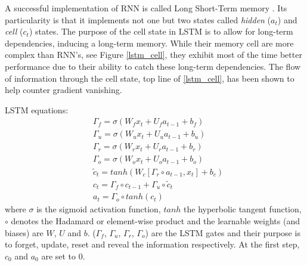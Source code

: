\documentclass[12pt, a4paper]{report}
\begin{document}
		\par
		A successful implementation of RNN is called Long Short-Term memory \cite{Hochreiter1997lstm}.
		Its particularity is that it implements not one but two states called {\itshape hidden} ($a_{t}$) and {\itshape cell} ($c_{t}$) states.
		The purpose of the cell state in LSTM is to allow for long-term dependencies, inducing a long-term memory.
		While their memory cell are more complex than RNN's, see Figure \ref{lstm_cell}, they exhibit most of the time better performance due to their ability to catch these long-term dependencies.
		The flow of information through the cell state, top line of \ref{lstm_cell}, has been shown to help counter gradient vanishing.
		\par
		LSTM equations:
		\begin{align*}
			& \Gamma_{f} = \sigma(W_{f}x_{t} + U_{f}a_{t-1} + b_{f}) \\
			& \Gamma_{u} = \sigma(W_{u}x_{t} + U_{u}a_{t-1} + b_{u}) \\
			& \Gamma_{r} = \sigma(W_{r}x_{t} + U_{r}a_{t-1} + b_{r}) \\
			& \Gamma_{o} = \sigma(W_{o}x_{t} + U_{o}a_{t-1} + b_{o}) \\
			& \tilde{c}_{t} = tanh(W_{c}[\Gamma_{r} \circ a_{t-1},x_{t}] + b_{c}) \\
			& c_{t} = \Gamma_{f} \circ c_{t-1} + \Gamma_{u} \circ \tilde{c}_{t} \\
			& a_{t} = \Gamma_{o} \circ tanh(c_{t})
		\end{align*}
		where $\sigma$ is the sigmoid activation function, $tanh$ the hyperbolic tangent function, $\circ$ denotes the Hadamard or element-wise product and the learnable weights (and biases) are $W$, $U$ and $b$.
		($\Gamma_{f}$, $\Gamma_{u}$, $\Gamma_{r}$, $\Gamma_{o}$) are the LSTM gates and their purpose is to forget, update, reset and reveal the information respectively.
		At the first step, $c_{0}$ and $a_{0}$ are set to 0.
\end{document}
